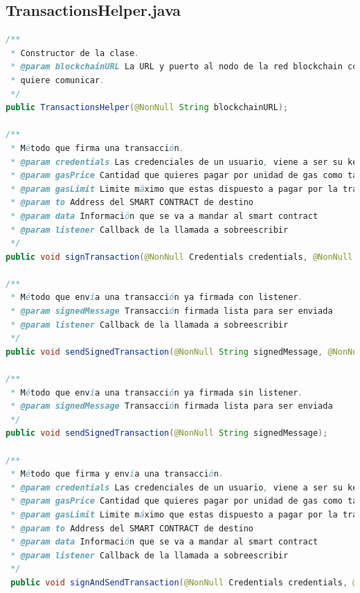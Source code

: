 \subsection{TransactionsHelper.java}
\begin{lstlisting}[language=Java,caption={[Java] Documentación de TransactionsHelper},label=lst:transactionHelper]
/**
 * Constructor de la clase.
 * @param blockchainURL La URL y puerto al nodo de la red blockchain con la que se
 * quiere comunicar. 
 */
public TransactionsHelper(@NonNull String blockchainURL);

/**
 * Método que firma una transacción.
 * @param credentials Las credenciales de un usuario, viene a ser su keystore
 * @param gasPrice Cantidad que quieres pagar por unidad de gas como tarifa al minero
 * @param gasLimit Limite máximo que estas dispuesto a pagar por la transacción
 * @param to Address del SMART CONTRACT de destino
 * @param data Información que se va a mandar al smart contract
 * @param listener Callback de la llamada a sobreescribir
 */
public void signTransaction(@NonNull Credentials credentials, @NonNull String gasPrice, @NonNull String gasLimit, @NonNull String to, @NonNull String data, @NonNull EasyBlockchainListener listener);

/**
 * Método que envía una transacción ya firmada con listener.
 * @param signedMessage Transacción firmada lista para ser enviada
 * @param listener Callback de la llamada a sobreescribir
 */
public void sendSignedTransaction(@NonNull String signedMessage, @NonNull EasyBlockchainListener listener);

/**
 * Método que envía una transacción ya firmada sin listener.
 * @param signedMessage Transacción firmada lista para ser enviada
 */
public void sendSignedTransaction(@NonNull String signedMessage);

/**
 * Método que firma y envía una transacción.
 * @param credentials Las credenciales de un usuario, viene a ser su keystore
 * @param gasPrice Cantidad que quieres pagar por unidad de gas como tarifa al minero
 * @param gasLimit Limite máximo que estas dispuesto a pagar por la transacción
 * @param to Address del SMART CONTRACT de destino
 * @param data Información que se va a mandar al smart contract
 * @param listener Callback de la llamada a sobreescribir
 */  
 public void signAndSendTransaction(@NonNull Credentials credentials, @NonNull String gasPrice, @NonNull String gasLimit, @NonNull String to, @NonNull String data);
\end{lstlisting}

